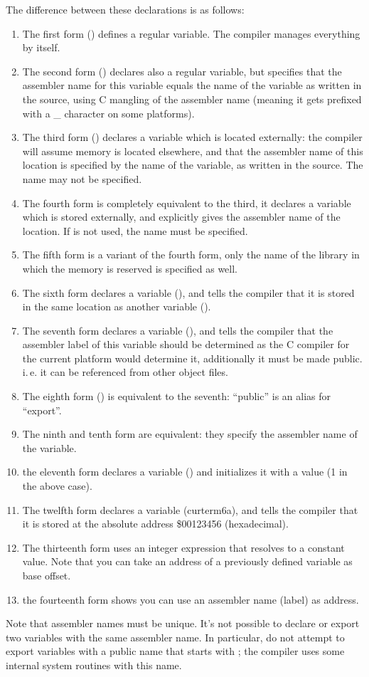 The difference between these declarations is as follows:
\begin{enumerate}
\item The first form () defines a regular variable. The
compiler manages everything by itself.
\item The second form () declares also a regular variable,
but specifies that the assembler name for this variable equals the name
of the variable as written in the source, using C mangling of the assembler
name (meaning it gets prefixed with a \_ character on some platforms).
\item The third form () declares a variable which is located
externally: the compiler will assume memory is located elsewhere, and that
the assembler name of this location is specified by the name of the
variable, as written in the source. The name may not be specified.
\item The fourth form is completely equivalent to the third, it declares a
variable which is stored externally, and explicitly gives the assembler
name of the location. If  is not used, the name must be specified.
\item The fifth form is a variant of the fourth form, only the name of the
library in which the memory is reserved is specified as well.
\item The sixth form declares a variable (), and tells the compiler that it is
stored in the same location as another variable ().
\item The seventh form declares a variable (), and tells the
compiler that the assembler label of this variable should be determined as
the C compiler for the current platform would determine it, additionally it must be made public. i.\,e. it can be
referenced from other object files.
\item The eighth form () is equivalent to the seventh: ``public''
is an alias for ``export''.
\item The ninth and tenth form are equivalent: they specify the assembler
name of the variable.
\item the eleventh form declares a variable () and
initializes it with a value (1 in the above case).
\item The twelfth form declares a variable (curterm6a), and tells the compiler that it is stored at the absolute address \$00123456 (hexadecimal).
\item The thirteenth form uses an integer expression that resolves to a constant value.
Note that you can take an address of a previously defined variable as base
offset.
\item the fourteenth form shows you can use an assembler name (label) as
address.
\end{enumerate}
Note that assembler names must be unique. It's not possible to declare or
export two variables with the same assembler name. In particular, do not
attempt to export variables with a public name that starts with ;
the compiler uses some internal system routines with this name.

